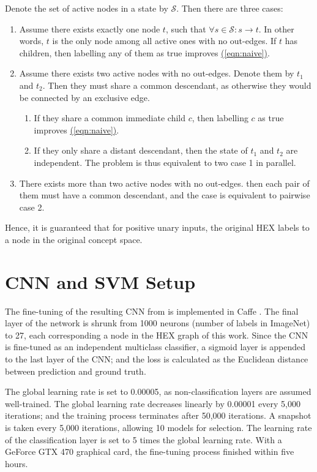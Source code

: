 \documentclass[11pt,a4paper]{article}
\begin{document}
Denote the set of active nodes in a state by $\mathcal{S}$. Then there are three cases:
\begin{enumerate}
\item Assume there exists exactly one node $t$, such that $\forall s\in\mathcal{S}:s\rightarrow t$. In other words, $t$ is the only node among all active ones with no out-edges. If $t$ has children, then labelling any of them as true improves \hyperref[eqn:naive]{(\ref{eqn:naive})}.
\item Assume there exists two active nodes with no out-edges. Denote them by $t_1$ and $t_2$. Then they must share a common descendant, as otherwise they would be connected by an exclusive edge.
\begin{enumerate}
\item If they share a common immediate child $c$, then labelling $c$ as true improves \hyperref[eqn:naive]{(\ref{eqn:naive})}.
\item If they only share a distant descendant, then the state of $t_1$ and $t_2$ are independent. The problem is thus equivalent to two case 1 in parallel.
\end{enumerate}
\item There exists more than two active nodes with no out-edges. then each pair of them must have a common descendant, and the case is equivalent to pairwise case 2.
\end{enumerate}
Hence, it is guaranteed that for positive unary inputs, the original HEX labels to a node in the original concept space.

\section{CNN and SVM Setup}
\label{sec:setup}

The fine-tuning of the resulting CNN from \cite{krizhevsky2012imagenet} is implemented in Caffe \cite{jia2014caffe}. The final layer of the network is shrunk from 1000 neurons (number of labels in ImageNet) to 27, each corresponding a node in the HEX graph of this work. Since the CNN is fine-tuned as an independent multiclass classifier, a sigmoid layer is appended to the last layer of the CNN; and the loss is calculated as the Euclidean distance between prediction and ground truth.

The global learning rate is set to 0.00005, as non-classification layers are assumed well-trained. The global learning rate decreases linearly by 0.00001 every 5,000 iterations; and the training process terminates after 50,000 iterations. A snapshot is taken every 5,000 iterations, allowing 10 models for selection. The learning rate of the classification layer is set to 5 times the global learning rate. With a GeForce GTX 470 graphical card, the fine-tuning process finished within five hours.
\end{document}
